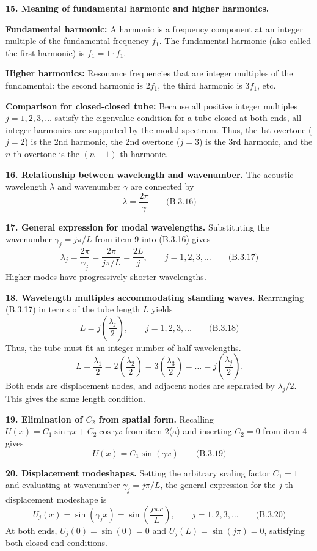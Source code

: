 \textbf{15. Meaning of fundamental harmonic and higher harmonics.}
\par\smallskip\noindent
\textbf{Fundamental harmonic:} A harmonic is a frequency component at an integer multiple of the fundamental frequency $f_1$. The fundamental harmonic (also called the first harmonic) is $f_1=1\cdot f_1$.
\par\smallskip\noindent
\textbf{Higher harmonics:} Resonance frequencies that are integer multiples of the fundamental: the second harmonic is $2f_1$, the third harmonic is $3f_1$, etc.
\par\smallskip\noindent
\textbf{Comparison for closed-closed tube:} Because all positive integer multiples $j=1,2,3,\ldots$ satisfy the eigenvalue condition for a tube closed at both ends, all integer harmonics are supported by the modal spectrum. Thus, the 1st overtone ($j=2$) is the 2nd harmonic, the 2nd overtone ($j=3$) is the 3rd harmonic, and the $n$-th overtone is the $(n+1)$-th harmonic.

\textbf{16. Relationship between wavelength and wavenumber.} The acoustic wavelength $\lambda$ and wavenumber $\gamma$ are connected by
\[
\boxed{\lambda=\frac{2\pi}{\gamma}}\qquad\text{(B.3.16)}
\]

\textbf{17. General expression for modal wavelengths.} Substituting the wavenumber $\gamma_j=j\pi/L$ from item 9 into (B.3.16) gives
\[
\boxed{\lambda_j=\frac{2\pi}{\gamma_j}=\frac{2\pi}{j\pi/L}=\frac{2L}{j},\qquad j=1,2,3,\ldots}\qquad\text{(B.3.17)}
\]
Higher modes have progressively shorter wavelengths.

\textbf{18. Wavelength multiples accommodating standing waves.} Rearranging (B.3.17) in terms of the tube length $L$ yields
\[
\boxed{L=j\left(\frac{\lambda_j}{2}\right),\qquad j=1,2,3,\ldots}\qquad\text{(B.3.18)}
\]
Thus, the tube must fit an integer number of half-wavelengths.
\[
L=\frac{\lambda_1}{2}=2\left(\frac{\lambda_2}{2}\right)=3\left(\frac{\lambda_3}{2}\right)=\dots=j\left(\frac{\lambda_j}{2}\right).
\]
Both ends are displacement nodes, and adjacent nodes are separated by $\lambda_j/2$. This gives the same length condition.

\textbf{19. Elimination of $C_2$ from spatial form.} Recalling $U(x)=C_1\sin\gamma x+C_2\cos\gamma x$ from item 2(a) and inserting $C_2=0$ from item 4 gives
\[
\boxed{U(x)=C_1\sin(\gamma x)}\qquad\text{(B.3.19)}
\]

\textbf{20. Displacement modeshapes.} Setting the arbitrary scaling factor $C_1=1$ and evaluating at wavenumber $\gamma_j=j\pi/L$, the general expression for the $j$-th displacement modeshape is
\[
\boxed{U_j(x)=\sin(\gamma_j x)=\sin\left(\frac{j\pi x}{L}\right),\qquad j=1,2,3,\ldots}\qquad\text{(B.3.20)}
\]
At both ends, $U_j(0)=\sin(0)=0$ and $U_j(L)=\sin(j\pi)=0$, satisfying both closed-end conditions.

